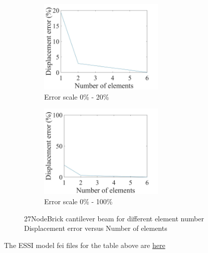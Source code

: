 \documentclass[fleqn,11pt]{article}
\begin{document}
\begin{figure}[H]
  \begin{subfigure}{0.5\textwidth}
    \centering
    \includegraphics[width=6cm]{../Figure-files/error27brick_beam_different_element_number.jpeg}
    \caption{Error scale 0\% - 20\%}
  \end{subfigure}
  \begin{subfigure}{0.5\textwidth}
    \centering
    \includegraphics[width=6cm]{../Figure-files/error27brick_beam_different_element_number100.jpeg}
    \caption{Error scale 0\% - 100\%}
  \end{subfigure}
  \captionsetup{justification=centering,margin=2cm}
  \caption{27NodeBrick cantilever beam for different element number\\
    Displacement error   versus   Number of elements}
  \label{fig error 27NodeBrick cantilever beam for different element number}
\end{figure}


The ESSI model fei files for the table above are \href{https://github.com/yuan-energy/ESSI_Verification/blob/master/27NodeBrick/cantilever_different_element_number/cantilever_different_element_number.tar.gz?raw=true}{here}




\end{document}
